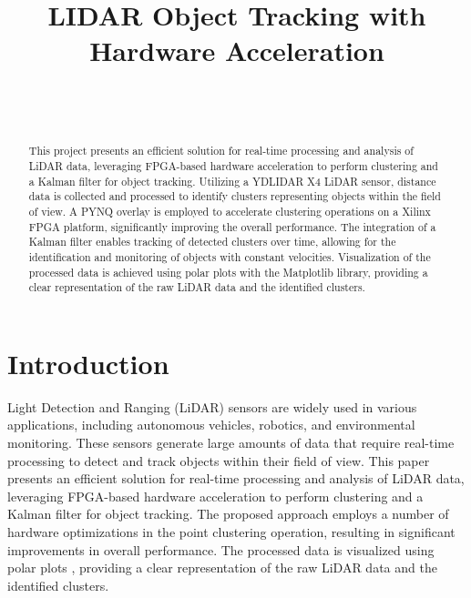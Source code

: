\documentclass[journal]{IEEEtran} %
\begin{document}
\title{LIDAR Object Tracking with Hardware Acceleration}


\author{%
    \\%
    \\%
}

\maketitle

\begin{abstract}
This project presents an efficient solution for real-time processing and analysis of LiDAR data, leveraging FPGA-based hardware acceleration to perform clustering and a Kalman filter for object tracking. Utilizing a YDLIDAR X4 LiDAR sensor, distance data is collected and processed to identify clusters representing objects within the field of view. A PYNQ overlay is employed to accelerate clustering operations on a Xilinx FPGA platform, significantly improving the overall performance. The integration of a  Kalman filter enables tracking of detected clusters over time, allowing for the identification and monitoring of objects with constant velocities. Visualization of the processed data is achieved using polar plots with the Matplotlib library, providing a clear representation of the raw LiDAR data and the identified clusters.
\end{abstract}

\section{Introduction}
Light Detection and Ranging (LiDAR) sensors are widely used in various applications, including autonomous vehicles, robotics, and environmental monitoring. These sensors generate large amounts of data that require real-time processing to detect and track objects within their field of view. This paper presents an efficient solution for real-time processing and analysis of LiDAR data, leveraging FPGA-based hardware acceleration to perform clustering and a Kalman filter for object tracking. The proposed approach employs a number of hardware optimizations in the point clustering operation, resulting in significant improvements in overall performance. The processed data is visualized using polar plots , providing a clear representation of the raw LiDAR data and the identified clusters.
\end{document}
